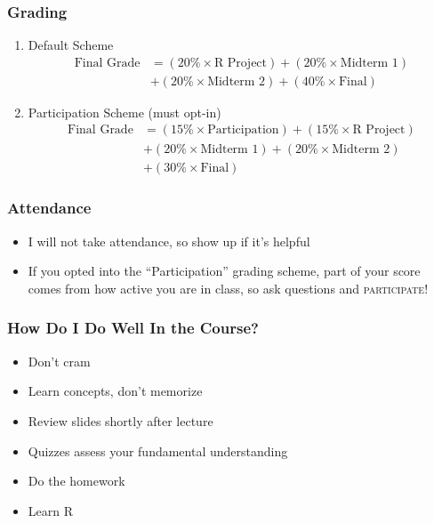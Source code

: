 \documentclass{beamer}
\begin{document}
\begin{frame}
\frametitle{Grading}
	\begin{enumerate}
		\item \alert{Default Scheme}
			\begin{align*}
			\text{Final Grade} &= (20\% \times \text{R Project}) + (20\% \times \text{Midterm 1})  
			\\
			&+ (20\% \times \text{Midterm 2}) + (40\% \times \text{Final})
			\end{align*}
		\item \alert{Participation Scheme (must opt-in)}
			\begin{align*}
			\text{Final Grade} &= (15\% \times \text{Participation}) + (15\% \times \text{R Project})
			\\
			&+ (20\% \times \text{Midterm 1}) + (20\% \times \text{Midterm 2})
			\\
			&+ (30\% \times \text{Final})
			\end{align*}
	\end{enumerate}
\end{frame}

\begin{frame}
\frametitle{Attendance}
	\begin{itemize}
		\item I will not take attendance, so show up if it's helpful
		\item If you opted into the ``Participation'' grading scheme, part of your score comes from 			how active you are in class, so ask questions and \alert{\textsc{participate}}!
	\end{itemize}
\end{frame}

\begin{frame}
\frametitle{How Do I Do Well In the Course?}
	\begin{itemize}[<+- | alert@+>]
		\item Don't cram
		\item Learn concepts, don't memorize
		\item Review slides shortly after lecture
		\item Quizzes assess your fundamental understanding
		\item Do the homework
		\item Learn R\alert<7>{\only<7>{, seriously.}}
	\end{itemize}
\end{frame}
\end{document}
